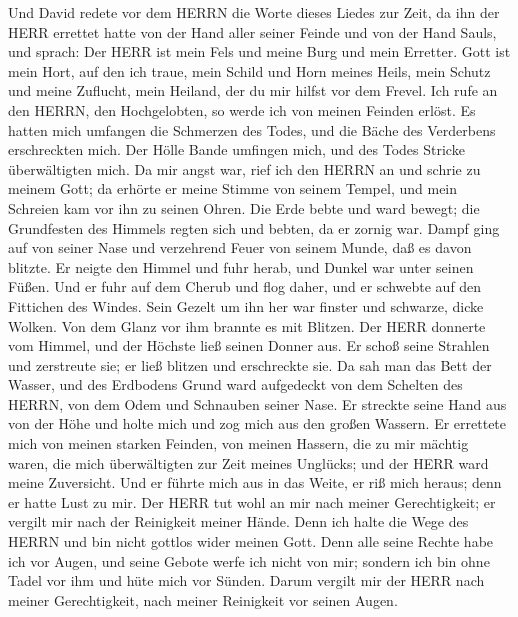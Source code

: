  Und David redete vor dem HERRN die Worte dieses Liedes zur
Zeit, da ihn der HERR errettet hatte von der Hand aller seiner Feinde
und von der Hand Sauls, und sprach:  Der HERR ist mein Fels
und meine Burg und mein Erretter.  Gott ist mein Hort, auf
den ich traue, mein Schild und Horn meines Heils, mein Schutz und meine
Zuflucht, mein Heiland, der du mir hilfst vor dem Frevel. 
Ich rufe an den HERRN, den Hochgelobten, so werde ich von meinen Feinden
erlöst.  Es hatten mich umfangen die Schmerzen des Todes,
und die Bäche des Verderbens erschreckten mich.  Der Hölle
Bande umfingen mich, und des Todes Stricke überwältigten mich.
 Da mir angst war, rief ich den HERRN an und schrie zu
meinem Gott; da erhörte er meine Stimme von seinem Tempel, und mein
Schreien kam vor ihn zu seinen Ohren.  Die Erde bebte und
ward bewegt; die Grundfesten des Himmels regten sich und bebten, da er
zornig war.  Dampf ging auf von seiner Nase und verzehrend
Feuer von seinem Munde, daß es davon blitzte.  Er neigte
den Himmel und fuhr herab, und Dunkel war unter seinen Füßen.
 Und er fuhr auf dem Cherub und flog daher, und er schwebte
auf den Fittichen des Windes.  Sein Gezelt um ihn her war
finster und schwarze, dicke Wolken.  Von dem Glanz vor ihm
brannte es mit Blitzen.  Der HERR donnerte vom Himmel, und
der Höchste ließ seinen Donner aus.  Er schoß seine
Strahlen und zerstreute sie; er ließ blitzen und erschreckte sie.
 Da sah man das Bett der Wasser, und des Erdbodens Grund
ward aufgedeckt von dem Schelten des HERRN, von dem Odem und Schnauben
seiner Nase.  Er streckte seine Hand aus von der Höhe und
holte mich und zog mich aus den großen Wassern.  Er
errettete mich von meinen starken Feinden, von meinen Hassern, die zu
mir mächtig waren,  die mich überwältigten zur Zeit meines
Unglücks; und der HERR ward meine Zuversicht.  Und er
führte mich aus in das Weite, er riß mich heraus; denn er hatte Lust zu
mir.  Der HERR tut wohl an mir nach meiner Gerechtigkeit;
er vergilt mir nach der Reinigkeit meiner Hände.  Denn ich
halte die Wege des HERRN und bin nicht gottlos wider meinen Gott.
 Denn alle seine Rechte habe ich vor Augen, und seine
Gebote werfe ich nicht von mir;  sondern ich bin ohne Tadel
vor ihm und hüte mich vor Sünden.  Darum vergilt mir der
HERR nach meiner Gerechtigkeit, nach meiner Reinigkeit vor seinen Augen.
